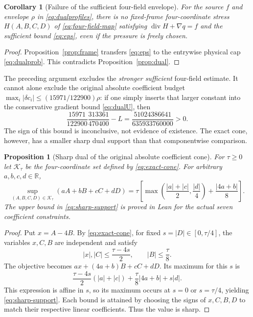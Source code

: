 \documentclass[11pt,a4paper]{article}
\theoremstyle{plain}
\newtheorem{proposition}[theorem]{Proposition}
\newtheorem{corollary}[theorem]{Corollary}
\theoremstyle{definition}
\newcommand{\R}{\mathbb{R}}
\newcommand{\diver}{\operatorname{div}}
\begin{document}
\begin{corollary}[Failure of the sufficient four-field envelope]
\label{cor:four-field}
For the source $f$ and envelope $\rho$ in
\eqref{eq:dualprofiles}, there is no fixed-frame four-coordinate
stress $H(A,B,C,D)$ of \eqref{eq:four-field-map} satisfying
$\diver H+\nabla q=f$ and the sufficient bound
\eqref{eq:eps}, even if the pressure is freely chosen.
\end{corollary}

\begin{proof}
Proposition~\ref{prop:frame} transfers \eqref{eq:eps} to the
entrywise physical cap \eqref{eq:dualprob}. This contradicts
Proposition~\ref{prop:dual}.
\end{proof}

The preceding argument excludes the \emph{stronger sufficient}
four-field estimate. It cannot alone exclude the original absolute
coefficient budget $\max_i|\delta c_i|\le(15971/122900)\rho$:
if one simply inserts that larger constant into the conservative
gradient bound \eqref{eq:dualU}, then
\begin{equation}\label{eq:weaker-inconclusive}
 \frac{15971}{122900}\frac{313361}{470400}-L
 =\frac{51024386641}{635933760000}>0.
\end{equation}
The sign of this bound is inconclusive, not evidence of existence.
The exact cone, however, has a smaller sharp dual support than
that componentwise comparison.

\begin{proposition}[Sharp dual of the original absolute coefficient cone]
\label{prop:sharp-cone}
For $\tau\ge0$ let $\mathcal K_\tau$ be the four-coordinate set
defined by \eqref{eq:exact-cone}. For arbitrary $a,b,c,d\in\R$,
\begin{equation}\label{eq:sharp-support}
 \sup_{(A,B,C,D)\in\mathcal K_\tau}
 (aA+bB+cC+dD)
 =\tau\left[
 \max\!\left(\frac{|a|+|c|}{2},\frac{|d|}{4}\right)
 +\frac{|4a+b|}{8}\right].
\end{equation}
The upper bound in \eqref{eq:sharp-support} is proved in Lean for
the actual seven coefficient constraints.
\end{proposition}

\begin{proof}
Put $x=A-4B$. By \eqref{eq:exact-cone}, for fixed
$s=|D|\in[0,\tau/4]$, the variables $x,C,B$ are independent and
satisfy
\[
 |x|,|C|\le\frac{\tau-4s}{2},\qquad |B|\le\frac\tau8.
\]
The objective becomes $ax+(4a+b)B+cC+dD$. Its maximum for this
$s$ is
\[
 \frac{\tau-4s}{2}(|a|+|c|)
 +\frac\tau8|4a+b|+s|d|.
\]
This expression is affine in $s$, so its maximum occurs at $s=0$
or $s=\tau/4$, yielding \eqref{eq:sharp-support}. Each bound is
attained by choosing the signs of $x,C,B,D$ to match their respective
linear coefficients. Thus the value is sharp.
\end{proof}
\end{document}
